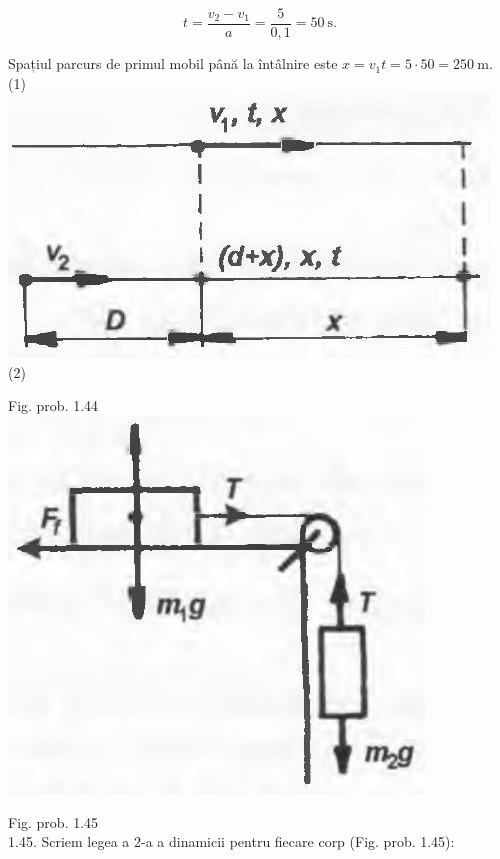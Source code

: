 \documentclass[10pt]{article}
\begin{document}
$$
t=\frac{v_{2}-v_{1}}{a}=\frac{5}{0,1}=50 \mathrm{~s} .
$$

Spațiul parcurs de primul mobil până la întâlnire este $x=v_{1} t=5 \cdot 50=250 \mathrm{~m}$.\\
(1)\\
\includegraphics[max width=\textwidth, center]{2025_07_01_5b3ff9fa0d508c8e9f17g-206(1)}\\
(2)

Fig. prob. 1.44\\
\includegraphics[max width=\textwidth, center]{2025_07_01_5b3ff9fa0d508c8e9f17g-206}

Fig. prob. 1.45\\
1.45. Scriem legea a 2-a a dinamicii pentru fiecare corp (Fig. prob. 1.45):
\end{document}
